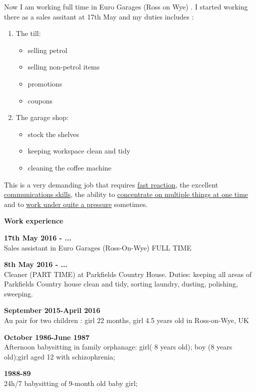 \documentclass[a4paper,12pt,final]{memoir}
\newcommand{\SmallSep}{\vspace{0.5em}}
\newenvironment{Career Profile}
	{\ignorespaces\textbf{\color{ForestGreen} Career Profile}}
	{\Sep\ignorespacesafterend}
\newenvironment{Key experience}
	{\ignorespaces\textbf{\color{ForestGreen} Key experience}}
	{\Sep\ignorespacesafterend}
\newcommand{\CVSection}[1]
	{\Large\textbf{#1}\par
	\SmallSep\normalsize\normalfont}
\newcommand{\CVItem}[1]
	{\textbf{\color{ForestGreen} #1}}
\begin{document}
\begin{Key experience}
Now I am working full time in Euro Garages (Ross on Wye) . I started working there as a sales assitant at 17th May and my duties includes : 
\begin{enumerate}
\item The till: 
\begin{itemize}
\item selling petrol 
\item selling non-petrol items
\item promotions
\item coupons
\end{itemize}
\item The garage shop:
\begin{itemize}
\item stock the shelves
\item keeping workspace clean and tidy
\item cleaning the coffee machine
\end{itemize}
\end{enumerate}
This is a very demanding job that requires \underline{fast reaction}, the excellent \underline{communications skills}, the ability to \underline{concentrate on multiple things at one time} and to \underline{work under quite a pressure} sometimes. 
\end{Key experience}

\CVSection{Work experience}
\CVItem{17th May 2016 - ...}\\
Sales assistant in Euro Garages (Ross-On-Wye) FULL TIME
\SmallSep

\CVItem{ 8th May 2016 - ...}\\
Cleaner (PART TIME) at Parkfields Country House. Duties: keeping all areas of Parkfields Country house clean and tidy, sorting laundry, dusting, polishing, sweeping.
\SmallSep

\CVItem{September 2015-April 2016}\\
Au pair for two children : girl 22 months, girl 4.5 years old in Ross-on-Wye, UK
\SmallSep

\CVItem{October 1986-June 1987}\\
Afternoon babysitting in family orphanage: girl( 8 years old); boy (8 years old);girl aged 12 with schizophrenia;
\SmallSep

\CVItem{1988-89}\\
24h/7 babysitting of 9-month old baby girl; 
\SmallSep
\end{document}
